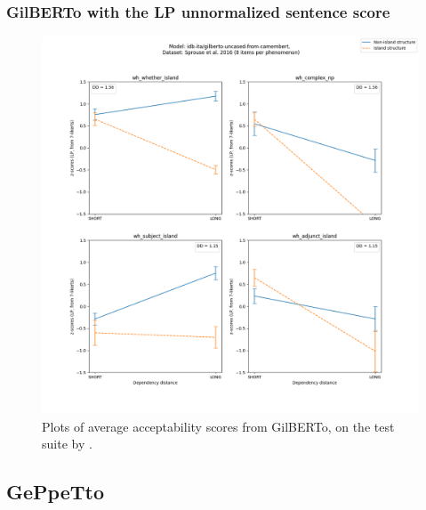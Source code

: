 \subsubsection{GilBERTo with the LP unnormalized sentence score}
\begin{figure}[h]
	\centering
	\includegraphics[width=1\textwidth]{images/Chapter1/Sprouse_wh_idb-ita_gilberto-uncased-from-camembert_LP-zscores-likert-2022-09-16_h10m19s47.png} 
	\caption{Plots of average acceptability scores from GilBERTo, on the test suite by \citet{sprouse2016experimental}.}
	\label{fig:sprouse_gilbertot_lp} 
	\medskip
\end{figure}	

\clearpage
\subsection{GePpeTto}
